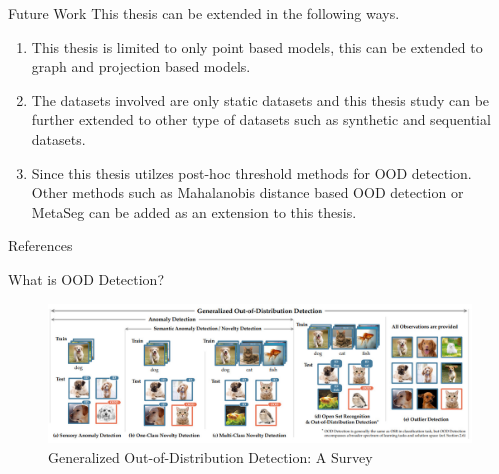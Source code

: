 \documentclass[aspectratio=169]{beamer}
\begin{document}
\begin{frame}{Future Work}
    This thesis can be extended in the following ways.
    \begin{enumerate}
        \item This thesis is limited to only point based models, this can be extended to graph and projection based models.
        \item The datasets involved are only static datasets and this thesis study can be further extended to other type of datasets such as synthetic and sequential datasets.
        \item Since this thesis utilzes post-hoc threshold methods for OOD detection. Other methods such as Mahalanobis distance based OOD detection \cite{lee2018simple_mahalanobis} or MetaSeg \cite{MetaSeg} can be added as an extension to this thesis.
    \end{enumerate}
\end{frame}

\begin{frame}[noframenumbering]{References}
    
    

\end{frame}

\begin{frame}[noframenumbering]{What is OOD Detection?}
    \begin{figure}
        \centering
        \includegraphics[scale=0.3]{images/OOD_ex_new.jpg}
        \caption{Generalized Out-of-Distribution Detection: A Survey}
        \label{fig:my_label}
    \end{figure}
\end{frame}
\end{document}

